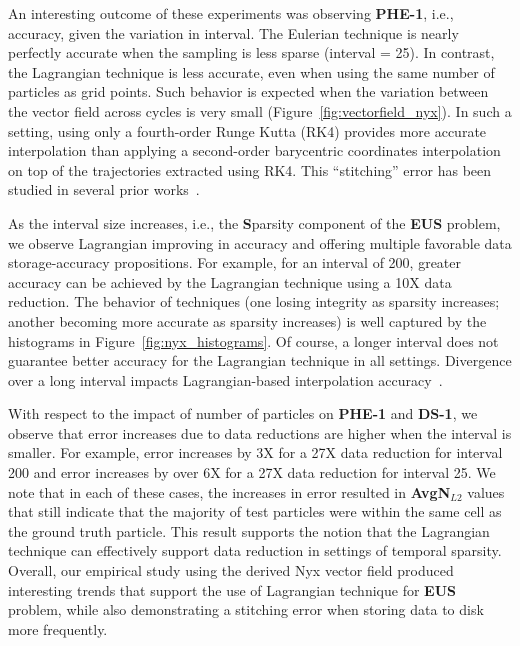 

An interesting outcome of these experiments was observing \textbf{PHE-1}, i.e., accuracy, given the variation in interval.
%
The Eulerian technique is nearly perfectly accurate when the sampling is less sparse (interval = 25).
%
In contrast, the Lagrangian technique is less accurate, even when using the same number of particles as grid points.
%
Such behavior is expected when the variation between the vector field across cycles is very small (Figure~\ref{fig:vectorfield_nyx}).
%
In such a setting, using only a fourth-order Runge Kutta (RK4) provides more accurate interpolation than applying a second-order barycentric coordinates interpolation on top of the trajectories extracted using RK4.
%
This ``stitching'' error has been studied in several prior works~\cite{hlawatsch2011hierarchical,bujack2015lagrangian,hummel2016error, sane2019interpolation}.


As the interval size increases, i.e., the \textbf{S}parsity component of the \textbf{EUS} problem, we observe Lagrangian improving in accuracy and offering multiple favorable data storage-accuracy propositions.
%
For example, for an interval of 200, greater accuracy can be achieved by the Lagrangian technique using a 10X data reduction.
%
The behavior of techniques (one losing integrity as sparsity increases; another becoming more accurate as sparsity increases) is well captured by the histograms in Figure~\ref{fig:nyx_histograms}.
%
Of course, a longer interval does not guarantee better accuracy for the Lagrangian technique in all settings.
%
Divergence over a long interval impacts Lagrangian-based interpolation accuracy~\cite{chandler2016analysis}.

With respect to the impact of number of particles on \textbf{PHE-1} and \textbf{DS-1}, we observe that error increases due to data reductions are higher when the interval is smaller. 
%
For example, error increases by 3X for a 27X data reduction for interval 200 and error increases by over 6X for a 27X data reduction for interval 25.
%
We note that in each of these cases, the increases in error resulted in \textbf{AvgN$_{L2}$} values that still indicate that the majority of test particles were within the same cell as the ground truth particle.
%
This result supports the notion that the Lagrangian technique can effectively support data reduction in settings of temporal sparsity.
%
Overall, our empirical study using the derived Nyx vector field produced interesting trends that support the use of Lagrangian technique for \textbf{EUS} problem, while also demonstrating a stitching error when storing data to disk more frequently.

